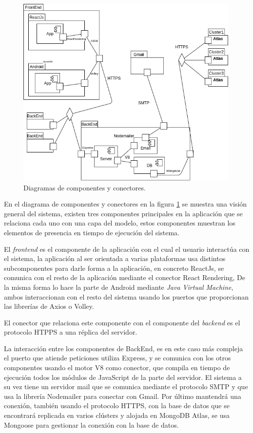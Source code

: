 \documentclass{article}
\begin{document}
\begin{figure}[H]
    \centering
        \includegraphics[width=0.99\textwidth]{../images/cyc.png}
    \caption{Diagramas de componentes y conectores.}
    \label{cyc}
\end{figure}

En el diagrama de componentes y conectores en la figura \ref{cyc} se muestra una visión general del sistema, existen tres componentes principales en la aplicación que se relaciona cada uno con una capa del modelo, estos componentes muestran los elementos de presencia en tiempo de ejecución del sistema.

El \textit{frontend} es el componente de la aplicación con el cual el usuario interactúa con el sistema, la aplicación al ser orientada a varias plataformas usa distintos subcomponentes para darle forma a la aplicación, en concreto ReactJs, se comunica con el resto de la aplicación mediante el conector React Rendering, De la misma forma lo hace la parte de Android mediante \textit{Java Virtual Machine}, ambos interaccionan con el resto del sistema usando los puertos que proporcionan las librerías de Axios o Volley.

El conector que relaciona este componente con el componente del \textit{backend} es el protocolo HTPPS a una réplica del servidor.

La interacción entre los componentes de BackEnd, es en este caso más compleja el puerto que atiende peticiones utiliza Express, y se comunica con los otros componentes usando el motor V8 como conector, que compila en tiempo de ejecución todos los módulos de JavaScript de la parte del servidor. El sistema a su vez tiene un servidor mail que se comunica mediante el protocolo SMTP y que usa la librería Nodemailer para conectar con Gmail. Por último mantendrá una conexión, también usando el protocolo HTTPS, con la base de datos que se encontrará replicada en varios clústers y alojada en MongoDB Atlas, se usa Mongoose para gestionar la conexión con la base de datos.
\end{document}
